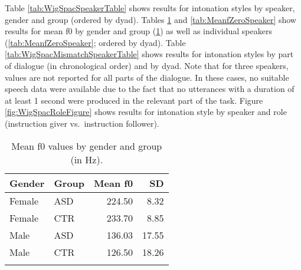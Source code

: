 Table \ref{tab:WigSpacSpeakerTable} shows results for intonation styles
by speaker, gender and group (ordered by dyad).
Tables \ref{tab:MeanfZeroGroup} and \ref{tab:MeanfZeroSpeaker} show
results for mean f0 by gender and group (\ref{tab:MeanfZeroGroup}) as
well as individual speakers (\ref{tab:MeanfZeroSpeaker}; ordered by
dyad).
Table \ref{tab:WigSpacMismatchSpeakerTable} shows results for intonation
styles by part of dialogue (in chronological order) and by dyad. Note
that for three speakers, values are not reported for all parts of the
dialogue. In these cases, no suitable speech data were available due to
the fact that no utterances with a duration of at least 1 second were
produced in the relevant part of the task.
Figure \ref{fig:WigSpacRoleFigure} shows results for intonation style by
speaker and role (instruction giver vs.~instruction follower).

\begin{table}
\caption{\label{tab:MeanfZeroGroup}Mean f0 values by gender and group (in Hz).}
\begin{tabularx}{.8\textwidth}{XXrr}
\lsptoprule
Gender & Group & Mean f0 & SD\\
\midrule
Female & ASD & 224.50 & 8.32\\
Female & CTR & 233.70 & 8.85\\
Male & ASD & 136.03 & 17.55\\
Male & CTR & 126.50 & 18.26\\
\lspbottomrule
\end{tabularx}
\end{table}


